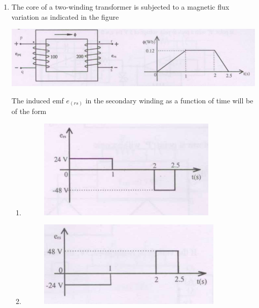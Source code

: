 \documentclass[journal,12pt,onecolumn]{IEEEtran}
\theoremstyle{remark}
\begin{document}
\begin{enumerate}[start=1, label=Q.\arabic*]
\begin{multicols}{4}
\begin{enumerate}[label=(\Alph*)]
    \item $23.06$ kW
    \item $24.11$ kW
    \item $25.01$ kW
    \item $26.21$ kW
\end{enumerate}
\end{multicols}
\hfill (GATE EE 2008)



\item The core of a two-winding transformer is subjected to a magnetic flux variation as indicated in the figure

\begin{center}
    \includegraphics[width=\columnwidth]{Fig/q49.png}
\end{center}
The induced emf $e_(rs)$ in the secondary winding as a function of time will be of the form
\begin{enumerate}[label=(\Alph*)]
        
    \item 
    \begin{figure}[H]
        \includegraphics[width=0.5\columnwidth]{Fig/q49-A.png}
    \end{figure}


    \item 
    \begin{figure}[H]
        \includegraphics[width=0.5\columnwidth]{Fig/q49-B.png}
    \end{figure}


\end{enumerate}
\end{enumerate}
\end{document}
